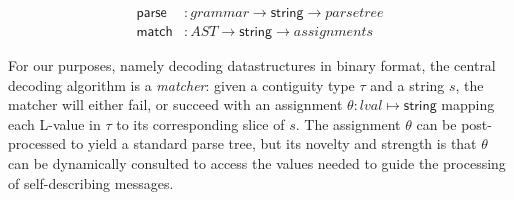 \documentclass[a4paper,UKenglish,cleveref, autoref, thm-restate]{lipics-v2021}
\newcommand{\konst}[1]{\ensuremath{\mathsf{#1}}}
\begin{document}
\begin{align*}
  \konst{parse} &: \mathit{grammar} \to \konst{string} \to \mathit{parse tree} \\
  \konst{match} &: \mathit{AST} \to \konst{string} \to \mathit{assignments}
\end{align*}

For our purposes, namely decoding datastructures in binary format, the
central decoding algorithm is a \emph{matcher}: given a contiguity
type $\tau$ and a string $s$, the matcher will either fail, or succeed
with an assignment $\theta : \mathit{lval} \mapsto \konst{string}$
mapping each L-value in $\tau$ to its corresponding slice of $s$. The
assignment $\theta$ can be post-processed to yield a standard parse
tree, but its novelty and strength is that $\theta$ can be dynamically
consulted to access the values needed to guide the processing of
self-describing messages.
\end{document}
